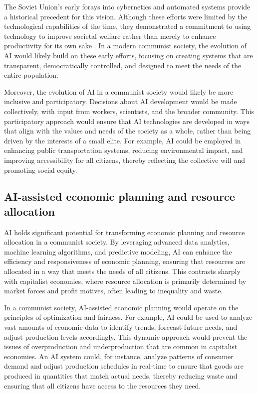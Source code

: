 The Soviet Union's early forays into cybernetics and automated systems provide a historical precedent for this vision. Although these efforts were limited by the technological capabilities of the time, they demonstrated a commitment to using technology to improve societal welfare rather than merely to enhance productivity for its own sake \cite[pp.~182-186]{Peters2001HowNotToNetworkANation}. In a modern communist society, the evolution of AI would likely build on these early efforts, focusing on creating systems that are transparent, democratically controlled, and designed to meet the needs of the entire population.

Moreover, the evolution of AI in a communist society would likely be more inclusive and participatory. Decisions about AI development would be made collectively, with input from workers, scientists, and the broader community. This participatory approach would ensure that AI technologies are developed in ways that align with the values and needs of the society as a whole, rather than being driven by the interests of a small elite. For example, AI could be employed in enhancing public transportation systems, reducing environmental impact, and improving accessibility for all citizens, thereby reflecting the collective will and promoting social equity.

\subsection{AI-assisted economic planning and resource allocation}

AI holds significant potential for transforming economic planning and resource allocation in a communist society. By leveraging advanced data analytics, machine learning algorithms, and predictive modeling, AI can enhance the efficiency and responsiveness of economic planning, ensuring that resources are allocated in a way that meets the needs of all citizens. This contrasts sharply with capitalist economies, where resource allocation is primarily determined by market forces and profit motives, often leading to inequality and waste.

In a communist society, AI-assisted economic planning would operate on the principles of optimization and fairness. For example, AI could be used to analyze vast amounts of economic data to identify trends, forecast future needs, and adjust production levels accordingly. This dynamic approach would prevent the issues of overproduction and underproduction that are common in capitalist economies. An AI system could, for instance, analyze patterns of consumer demand and adjust production schedules in real-time to ensure that goods are produced in quantities that match actual needs, thereby reducing waste and ensuring that all citizens have access to the resources they need.

